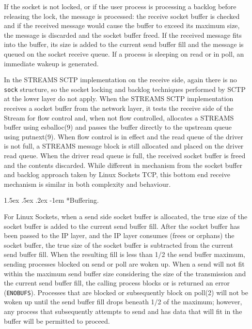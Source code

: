 \documentclass[letterpaper,final,notitlepage,twocolumn,10pt,twoside]{article}
\makeatletter
\renewcommand\paragraph{\@startsection{paragraph}{4}{\z@}%
                                    {1.5ex \@plus .5ex \@minus .2ex}%
                                    {-1em}%
                                    {\normalfont\normalsize\bfseries\slshape}}
\makeatother
\begin{document}
If the socket is not locked, or if the user process is processing a backlog before releasing the
lock, the message is processed: the receive socket buffer is checked and if the received message
would cause the buffer to exceed its maximum size, the message is discarded and the socket buffer
freed.  If the received message fits into the buffer, its size is added to the current send buffer
fill and the message is queued on the socket receive queue.  If a process is sleeping on read or in
poll, an immediate wakeup is generated.

In the STREAMS SCTP implementation on the receive side, again there is no \texttt{sock} structure,
so the socket locking and backlog techniques performed by SCTP at the lower layer do not apply.
When the STREAMS SCTP implementation receives a socket buffer from the network layer, it tests the
receive side of the Stream for flow control and, when not flow controlled, allocates a STREAMS
buffer using esballoc(9) and passes the buffer directly to the upstream queue using putnext(9).
When flow control is in effect and the read queue of the driver is not full, a STREAMS message block
is still allocated and placed on the driver read queue.  When the driver read queue is full, the
received socket buffer is freed and the contents discarded.  While different in mechanism from the
socket buffer and backlog approach taken by Linux Sockets TCP, this bottom end receive mechanism is
similar in both complexity and behaviour.

\paragraph*{Buffering.}

For Linux Sockets, when a send side socket buffer is allocated, the true size of the socket buffer
is added to the current send buffer fill.  After the socket buffer has been passed to the IP layer,
and the IP layer consumes (frees or orphans) the socket buffer, the true size of the socket buffer
is subtracted from the current send buffer fill.  When the resulting fill is less than 1/2 the send
buffer maximum, sending processes blocked on send or poll are woken up.  When a send will not fit
within the maximum send buffer size considering the size of the transmission and the current send
buffer fill, the calling process blocks or is returned an error (\texttt{ENOBUFS}).  Processes that
are blocked or subsequently block on poll(2) will not be woken up until the send buffer fill drops
beneath 1/2 of the maximum; however, any process that subsequently attempts to send and has data
that will fit in the buffer will be permitted to proceed.
\end{document}
